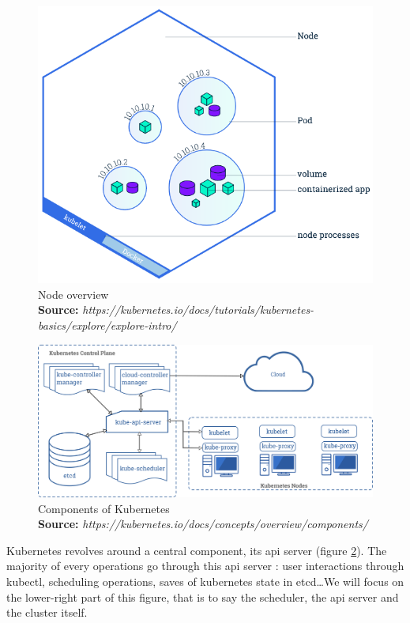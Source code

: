 \documentclass[12pt]{report}
\newcommand*{\captionsource}[2]{%
    \caption[{#1}]{%
        #1%
        \\\hspace{\linewidth}%
	\textbf{Source:} \textit{#2}%
    }%
}
\begin{document}
\begin{figure}[h]
	\centering
	\includegraphics[scale=0.5]{../imgs/node-overview.png}
	\captionsource{Node overview}{https://kubernetes.io/docs/tutorials/kubernetes-basics/explore/explore-intro/}
	\label{fig:node-overview}
\end{figure}


\begin{figure}[]
	\centering
	\includegraphics[width=\textwidth]{../imgs/components-of-kubernetes.png}
	\captionsource{Components of Kubernetes}{https://kubernetes.io/docs/concepts/overview/components/}
	\label{fig:kube-components}
\end{figure}

Kubernetes revolves around a central component, its api server (figure
\ref{fig:kube-components}). The majority of every operations go through this
api server : user interactions through kubectl, scheduling operations, saves of
kubernetes state in etcd\ldots We will focus on the lower-right part of this
figure, that is to say the scheduler, the api server and the cluster itself.
\end{document}
